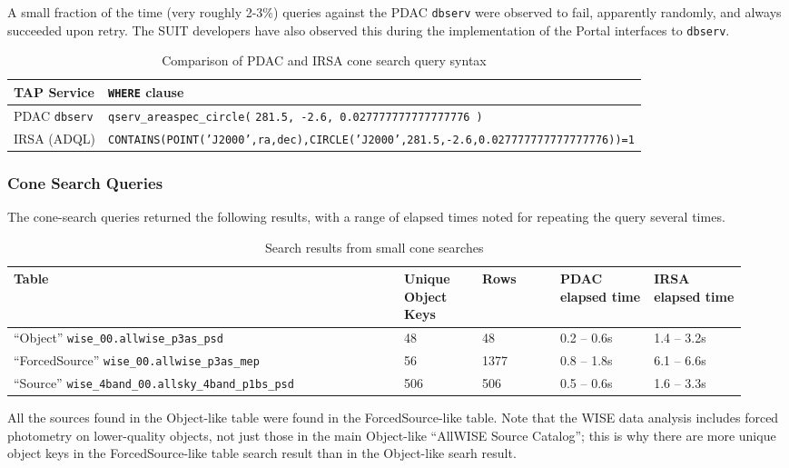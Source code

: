 \documentclass[DM,lsstdraft,STR,toc]{lsstdoc}
\begin{document}
A small fraction of the time (very roughly 2-3\%) queries against the PDAC \verb|dbserv| were observed to fail,
apparently randomly, and always succeeded upon retry.
The SUIT developers have also observed this during the implementation of the Portal interfaces to \verb|dbserv|.

\begin{table}[h]
\centering
\begin{tabular}{l l}
TAP Service & \texttt{WHERE} clause \\ \hline
PDAC \texttt{dbserv} & \verb|qserv_areaspec_circle(| \texttt{281.5, -2.6, 0.027777777777777776 )} \\
IRSA (ADQL) & \texttt{CONTAINS(POINT('J2000',ra,dec),CIRCLE('J2000',281.5,-2.6,0.027777777777777776))=1} \\
\end{tabular}
\caption{Comparison of PDAC and IRSA cone search query syntax}
\label{tab:conesyntax}
\end{table}

\subsubsection{Cone Search Queries}

The cone-search queries returned the following results, with a range of elapsed times noted for repeating the query several times.

\begin{table}[h]
\centering
\begin{tabular}{p{0.5 \linewidth} p{0.1 \linewidth} p{0.1 \linewidth} p{0.12 \linewidth} p{0.12 \linewidth}}
Table & Unique Object Keys & Rows & PDAC elapsed time & IRSA elapsed time \\ \hline
``Object'' \verb|wise_00.allwise_p3as_psd| & 48 & 48 & 0.2 -- 0.6s & 1.4 -- 3.2s \\
``ForcedSource'' \verb|wise_00.allwise_p3as_mep| & 56 & 1377 & 0.8 -- 1.8s & 6.1 -- 6.6s \\
``Source'' \verb|wise_4band_00.allsky_4band_p1bs_psd| & 506 & 506 & 0.5 -- 0.6s & 1.6 -- 3.3s \\
\end{tabular}
\caption{Search results from small cone searches}
\label{tab:conesyntax}
\end{table}

All the sources found in the Object-like table were found in the ForcedSource-like table.
Note that the WISE data analysis includes forced photometry on lower-quality objects,
not just those in the main Object-like ``AllWISE Source Catalog'';
this is why there are more unique object keys in the ForcedSource-like table search result than in the Object-like searh result.
\end{document}
